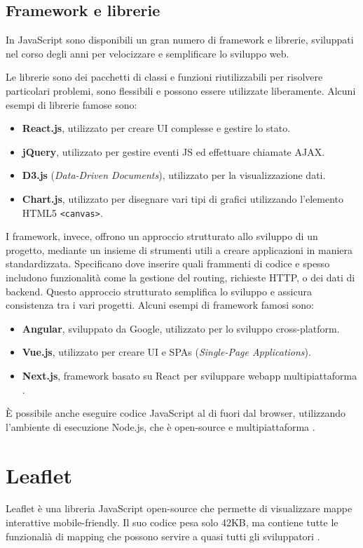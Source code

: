 \subsection{Framework e librerie}
In JavaScript sono disponibili un gran numero di framework e librerie, sviluppati nel corso degli anni per velocizzare e semplificare lo sviluppo web.

Le librerie sono dei pacchetti di classi e funzioni riutilizzabili per risolvere particolari problemi, sono flessibili e possono essere utilizzate liberamente. Alcuni esempi di librerie famose sono:
\begin{itemize}
    \item \textbf{React.js}, utilizzato per creare UI complesse e gestire lo stato.
    \item \textbf{jQuery}, utilizzato per gestire eventi JS ed effettuare chiamate AJAX.
    \item \textbf{D3.js} (\textit{Data-Driven Documents}), utilizzato per la visualizzazione dati.
    \item \textbf{Chart.js}, utilizzato per disegnare vari tipi di grafici utilizzando l'elemento HTML5 \Verb_<canvas>_.
\end{itemize}

I framework, invece, offrono un approccio strutturato allo sviluppo di un progetto, mediante un insieme di strumenti utili a creare applicazioni in maniera standardizzata. Specificano dove inserire quali frammenti di codice e spesso includono funzionalità come la gestione del routing, richieste HTTP, o dei dati di backend. Questo approccio strutturato semplifica lo sviluppo e assicura consistenza tra i vari progetti. Alcuni esempi di framework famosi sono:
\begin{itemize}
    \item \textbf{Angular}, sviluppato da Google, utilizzato per lo sviluppo cross-platform.
    \item \textbf{Vue.js}, utilizzato per creare UI e SPAs (\textit{Single-Page Applications}).
    \item \textbf{Next.js}, framework basato su React per sviluppare webapp multipiattaforma \cite{JS_Frameworks_Libraries}.
\end{itemize}

\`E possibile anche eseguire codice JavaScript al di fuori dal browser, utilizzando l'ambiente di esecuzione Node.js, che è open-source e multipiattaforma \cite{Node.js}.

\section{Leaflet}
Leaflet è una libreria JavaScript open-source che permette di visualizzare mappe interattive mobile-friendly. Il suo codice pesa solo 42KB, ma contiene tutte le funzionalià di mapping che possono servire a quasi tutti gli sviluppatori \cite{Leaflet_Overview, Leaflet}.

